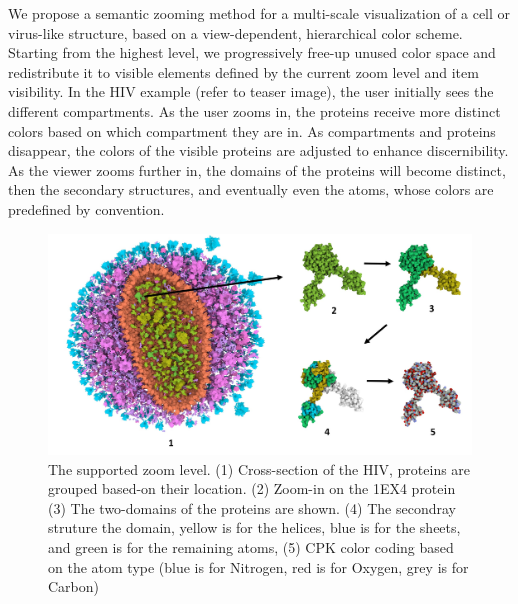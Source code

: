 \documentclass[review,journal]{vgtc}         %
\begin{document}
We propose a semantic zooming method for a multi-scale visualization of a cell or virus-like structure, based on a view-dependent, hierarchical color scheme.
Starting from the highest level, we progressively free-up unused color space and redistribute it to visible elements defined by the current zoom level and item visibility.
In the HIV example (refer to teaser image), the user initially sees the different compartments. 
As the user zooms in, the proteins receive more distinct colors based on which compartment they are in. 
As compartments and proteins disappear, the colors of the visible proteins are adjusted to enhance discernibility.  
As the viewer zooms further in, the domains of the proteins will become distinct, then the secondary structures, and eventually even the atoms, whose colors are predefined by convention. 

\begin{figure}
	\centering
	\includegraphics[width=1\linewidth]{Figures/Picture2_}
	\caption{The supported zoom level. (1) Cross-section of the HIV, proteins are grouped based-on their location. (2) Zoom-in on the 1EX4 protein (3) The two-domains of the proteins are shown. (4) The secondray struture the domain, yellow is for the helices, blue is for the sheets, and green is for the remaining atoms, (5) CPK color coding based on the atom type (blue is for Nitrogen, red is for Oxygen, grey is for Carbon)}
	\label{fig:Picture2}
\end{figure}
\end{document}
